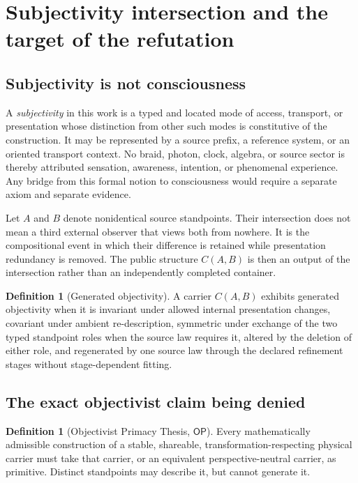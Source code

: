 \documentclass[11pt]{article}
\theoremstyle{definition}
\newtheorem{definition}[theorem]{Definition}
\theoremstyle{remark}
\newcommand{\OPT}{\mathsf{OP}}
\begin{document}
\section{Subjectivity intersection and the target of the refutation}

\subsection{Subjectivity is not consciousness}

A \emph{subjectivity} in this work is a typed and located mode of access, transport, or presentation whose distinction from other such modes is constitutive of the construction. It may be represented by a source prefix, a reference system, or an oriented transport context. No braid, photon, clock, algebra, or source sector is thereby attributed sensation, awareness, intention, or phenomenal experience. Any bridge from this formal notion to consciousness would require a separate axiom and separate evidence.

Let $A$ and $B$ denote nonidentical source standpoints. Their intersection does not mean a third external observer that views both from nowhere. It is the compositional event in which their difference is retained while presentation redundancy is removed. The public structure $C(A,B)$ is then an output of the intersection rather than an independently completed container.

\begin{definition}[Generated objectivity]
A carrier $C(A,B)$ exhibits generated objectivity when it is invariant under allowed internal presentation changes, covariant under ambient re-description, symmetric under exchange of the two typed standpoint roles when the source law requires it, altered by the deletion of either role, and regenerated by one source law through the declared refinement stages without stage-dependent fitting.
\end{definition}

\subsection{The exact objectivist claim being denied}

\begin{definition}[Objectivist Primacy Thesis, $\OPT$]
Every mathematically admissible construction of a stable, shareable, transformation-respecting physical carrier must take that carrier, or an equivalent perspective-neutral carrier, as primitive. Distinct standpoints may describe it, but cannot generate it.
\end{definition}
\end{document}
